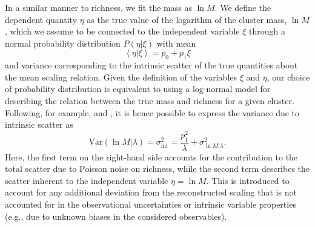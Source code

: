 \documentclass[longauth]{aa} %
\begin{document}
In a similar manner to richness, we fit the mass as $\ln{M}$.  We define the dependent quantity $\eta$ as the true value of the logarithm of the cluster mass, $\ln{M}$, which we assume to be connected to the independent variable $\xi$ through a normal probability distribution $P(\eta|\xi)$ with mean
\begin{equation}
    \left<\eta|\xi\right> = p_0+p_1\xi
\end{equation}
and variance corresponding to the intrinsic scatter of the true quantities about the mean scaling relation. Given the definition of the variables $\xi$ and $\eta$, our choice of probability distribution is equivalent to using a log-normal model for describing the relation between the true mass and richness for a given cluster. Following, for example, \citet{Evrard2014} and \citet{Simet2017}, it is hence possible to express the variance due to intrinsic scatter as
\begin{equation}
    \mathrm{Var}(\ln{M}|\lambda) = \sigma^2_{\mathrm{int}} =  \frac{p_1^2}{\lambda}+\sigma^2_{\ln{M}|\lambda}.
    \label{eq:scatter}
\end{equation}
Here, the first term on the right-hand side accounts for the contribution to the total scatter due to Poisson noise on richness, while the second term describes the scatter inherent to the independent variable $\eta=\ln{M}$. This is introduced to account for any additional deviation from the reconstructed scaling that is not accounted for in the observational uncertainties or intrinsic variable properties (e.g., due to unknown biases in the considered observables).
\end{document}
